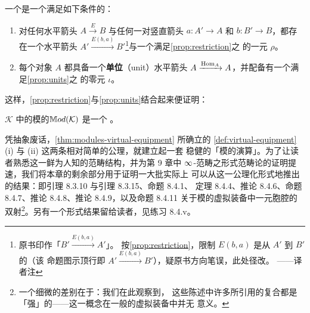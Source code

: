 \begin{definition}\label{def:virtual-equipment}
一个\textbf{\trVirtualEquipment}是一个满足如下条件的\trVirtualDoubleCategory{}：
\begin{enumerate}[label=(\roman*)]
\item 对任何水平箭头 $A\xrightarrow{E}B$ 与任何一对竖直箭头
$a\colon A'\to A$ 和 $b\colon B'\to B$，都存在一个水平箭头
$A'\xrightarrow{E(b,a)}B'$\footnote{原书印作「$B'\xrightarrow{E(b,a)}A'$」。
按\cref{prop:restriction}，限制 $E(b,a)$ 是从 $A'$ 到 $B'$ 的\trModule{}（该
命题图示顶行即 $A'\xrightarrow{E(b,a)}B'$），疑原书方向笔误，此处径改。
——译者注}与一个满足\cref{prop:restriction}之%
\trUniversalProperty{}的一元\trCartesian\trCell{} $\rho$。
\item 每个对象 $A$ 都具备一个\textbf{单位}（unit）水平箭头
$A\xrightarrow{\mathrm{Hom}_{A}}A$，并配备有一个满足\cref{prop:units}之%
\trUniversalProperty{}的零元\trCocartesian\trCell{} $\iota$。
\end{enumerate}
\end{definition}

这样，\cref{prop:restriction}与\cref{prop:units}结合起来便证明：

\begin{theorem}\label{thm:modules-virtual-equipment}
\trInfinityCosmos{} $\mathcal{K}$ 中的模的\trVirtualDoubleCategory $\mathbb{M}od(\mathcal{K})$ 是一个%
\trVirtualEquipment{}。
\end{theorem}

凭抽象废话，\cref{thm:modules-virtual-equipment} 所确立的%
\cref{def:virtual-equipment}(i) 与 (ii) 这两条相对简单的公理，就建立起一套%
稳健的「模的演算」。为了让读者熟悉这一鲜为人知的范畴结构，并为第 9 章中
$\infty$-范畴之形式范畴论的证明提速，我们将本章的剩余部分用于证明一大批实际上%
可以从这一公理化形式地推出的结果：即引理 8.3.10 与引理 8.3.15、命题 8.4.1、%
定理 8.4.4、推论 8.4.6、命题 8.4.7、推论 8.4.8、推论 8.4.9，以及命题 8.4.11
关于模的虚拟装备中一元胞腔的双射\footnote{一个细微的差别在于：我们在此观察到，%
这些陈述中许多所引用的复合都是「强」的——这一概念在一般的虚拟装备中并无%
意义。}。另有一个形式结果留给读者，见练习 8.4.v。

